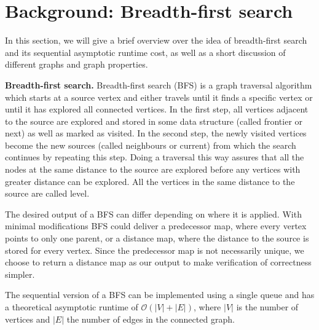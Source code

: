 \documentclass[letterpaper]{article}
\newcommand{\mypar}[1]{{\bf #1.}} %
\begin{document}


	\section{Background: Breadth-first search}\label{sec:background}
	
	
	In this section, we will give a brief overview over the idea of breadth-first search and its sequential asymptotic runtime cost, as well as a short discussion of different graphs and graph properties. 
	
	
	\mypar{Breadth-first search}
	Breadth-first search (BFS) is a graph traversal algorithm which starts at a source vertex and either travels until it finds a specific vertex or until it has explored all connected vertices. 
	In the first step, all vertices adjacent to the source are explored and stored in some data structure (called frontier or next) as well as marked as visited. 
	In the second step, the newly visited vertices become the new sources (called neighbours or current) from which the search continues by repeating this step. 
	Doing a traversal this way assures that all the nodes at the same distance to the source are explored before any vertices with greater distance can be explored. 
	All the vertices in the same distance to the source are called level.
	
	The desired output of a BFS can differ depending on where it is applied. With minimal modifications BFS could deliver a predecessor map, where every vertex points to only one parent, or a distance map, where the distance to the source is stored for every vertex. Since the predecessor map is not necessarily unique, we choose to return a distance map as our output to make verification of correctness simpler.  
	
	The sequential version of a BFS can be implemented using a single queue and has a theoretical asymptotic runtime of $\mathcal{O}(\lvert V\rvert + \lvert E\rvert )$, where $\lvert V\rvert$ is the number of vertices and $\lvert E\rvert$ the number of edges in the connected graph.
	
\end{document}
